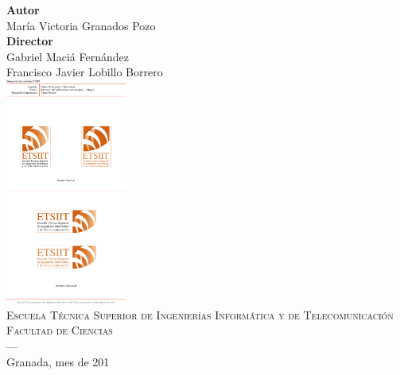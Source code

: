 \begin{titlepage}
\vspace{2.5cm}
\noindent\hspace*{\centeroffset}\begin{minipage}{\textwidth}
\centering

\textbf{Autor}\\ {María Victoria Granados Pozo}\\[2.5ex]
\textbf{Director}\\
{Gabriel Maciá Fernández\\
Francisco Javier Lobillo Borrero 
}\\[2cm]
\includegraphics[width=0.3\textwidth]{portada/imagenes/logoEtsiit.pdf}\\[0.1cm]
\textsc{Escuela Técnica Superior de Ingenierías Informática y de Telecomunicación}\\
\textsc{Facultad de Ciencias}\\

\textsc{---}\\
Granada, mes de 201
\end{minipage}
\end{titlepage}


